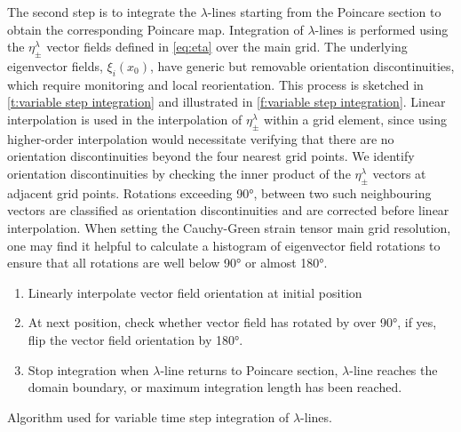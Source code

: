 \documentclass{elsarticle}
\begin{document}
The second step is to integrate the $\lambda$-lines  starting from the Poincare section to obtain the corresponding Poincare map. Integration of $\lambda$-lines is performed using the $\eta_\pm^\lambda$ vector fields defined in \cref{eq:eta} over the main grid. The underlying eigenvector fields, $\xi_i(x_0)$, have generic but removable orientation discontinuities, which require monitoring and local reorientation. This process is sketched in \cref{t:variable step integration} and illustrated in \cref{f:variable step integration}. Linear interpolation is used in the interpolation of $\eta_\pm^\lambda$ within a grid element, since using higher-order interpolation would necessitate verifying that there are no orientation discontinuities beyond the four nearest grid points. We identify orientation discontinuities by checking the inner product of the $\eta_\pm^\lambda$ vectors at adjacent grid points. Rotations exceeding 90°, between two such neighbouring vectors are classified as orientation discontinuities and are corrected before linear interpolation. When setting the Cauchy-Green strain tensor main grid resolution, one may find it helpful to calculate a histogram of eigenvector field rotations to ensure that all rotations are well below 90° or almost 180°.

\begin{table}
\begin{enumerate}
\item Linearly interpolate vector field orientation at initial position
\item At next position, check whether vector field has rotated by over 90°, if yes, flip the vector field orientation by 180°.
\item Stop integration when $\lambda$-line returns to Poincare section, $\lambda$-line reaches the domain boundary, or maximum integration length has been reached.
\end{enumerate}
\caption{Algorithm used for variable time step integration of $\lambda$-lines.}
\label{t:variable step integration}
\end{table}
\end{document}
